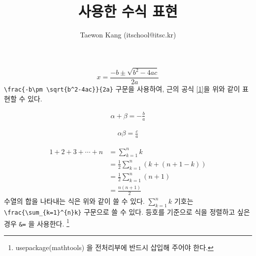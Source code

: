 \documentclass{oblivoir}
\author{Taewon Kang (itschool@itsc.kr)}
\title{\TeX를 사용한 수식 표현}
\begin{document}
	\maketitle
		\begin{equation} 
			x = \frac{-b\pm \sqrt{b^2-4ac}}{2a} \label{1}
		\end{equation}
		 \verb|\frac{-b\pm \sqrt{b^2-4ac}}{2a}| 구문을 사용하여, 근의 공식 \ref{1}을 위와 같이 표현할 수 있다.
		
		\begin{equation}
			\begin{gathered}
				\alpha + \beta = -\frac{b}{a} \label{2}
			\end{gathered}
		\end{equation}	
			
		\begin{equation}
			\begin{gathered}
				\alpha \beta = \frac{c}{a} \label{3}
			\end{gathered}
		\end{equation}
		
		\begin{align} %
			1 + 2 + 3 + \cdots + n &= \sum_{k=1}^{n}k \nonumber \\
			&= \frac{1}{2}\sum_{k=1}^{n}(k+(n+1-k)) \nonumber \\
			&= \frac{1}{2}\sum_{k=1}^{n}(n+1) \nonumber \\
			&= \frac{n(n+1)}{2}
		\end{align}
		 수열의 합을 나타내는 식은 위와 같이 쓸 수 있다. $\sum_{k=1}^{n}k$ 기호는 \verb|\frac{\sum_{k=1}^{n}k}| 구문으로 쓸 수 있다. 등호를 기준으로 식을 정렬하고 싶은 경우 \verb|&=| 을 사용한다. 
\footnote{usepackage(mathtools) 을 전처리부에 반드시 삽입해 주어야 한다.}

\vspace{10pt} 
\end{document}
